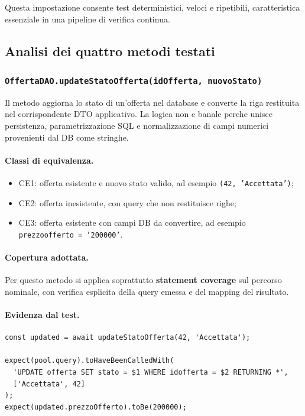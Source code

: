 \documentclass[a4paper,11pt]{article}
\begin{document}
Questa impostazione consente test deterministici, veloci e ripetibili, caratteristica essenziale in una pipeline di verifica continua.

\subsection{Analisi dei quattro metodi testati}

\subsubsection{\texttt{OffertaDAO.updateStatoOfferta(idOfferta, nuovoStato)}}
Il metodo aggiorna lo stato di un'offerta nel database e converte la riga restituita nel corrispondente DTO applicativo. La logica non e banale perche unisce persistenza, parametrizzazione SQL e normalizzazione di campi numerici provenienti dal DB come stringhe.

\paragraph{Classi di equivalenza.}
\begin{itemize}
  \item CE1: offerta esistente e nuovo stato valido, ad esempio \texttt{(42, 'Accettata')};
  \item CE2: offerta inesistente, con query che non restituisce righe;
  \item CE3: offerta esistente con campi DB da convertire, ad esempio \texttt{prezzoofferto = '200000'}.
\end{itemize}

\paragraph{Copertura adottata.}
Per questo metodo si applica soprattutto \textbf{statement coverage} sul percorso nominale, con verifica esplicita della query emessa e del mapping del risultato.

\paragraph{Evidenza dal test.}
\begin{lstlisting}[style=projectcode]
const updated = await updateStatoOfferta(42, 'Accettata');

expect(pool.query).toHaveBeenCalledWith(
  'UPDATE offerta SET stato = $1 WHERE idofferta = $2 RETURNING *',
  ['Accettata', 42]
);
expect(updated.prezzoOfferto).toBe(200000);
\end{lstlisting}
\end{document}
